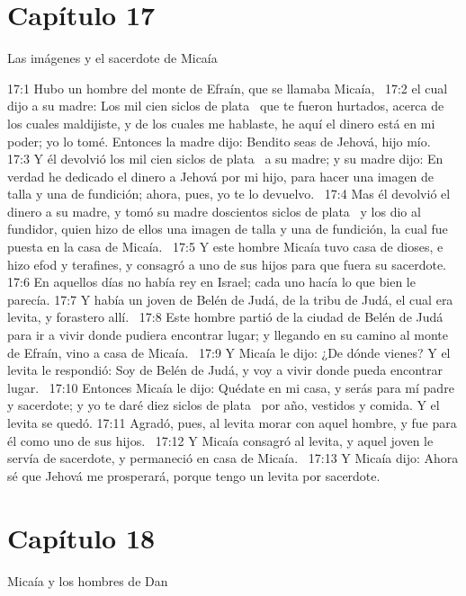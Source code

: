 \section*{Capítulo 17 }
Las imágenes y el sacerdote de Micaía 

17:1 Hubo un hombre del monte de Efraín, que se llamaba Micaía,  
17:2 el cual dijo a su madre: Los mil cien siclos de plata  que te fueron hurtados, acerca de los cuales maldijiste, y de los cuales me hablaste, he aquí el dinero está en mi poder; yo lo tomé. Entonces la madre dijo: Bendito seas de Jehová, hijo mío.  
17:3 Y él devolvió los mil cien siclos de plata  a su madre; y su madre dijo: En verdad he dedicado el dinero a Jehová por mi hijo, para hacer una imagen de talla y una de fundición; ahora, pues, yo te lo devuelvo.  
17:4 Mas él devolvió el dinero a su madre, y tomó su madre doscientos siclos de plata  y los dio al fundidor, quien hizo de ellos una imagen de talla y una de fundición, la cual fue puesta en la casa de Micaía.  
17:5 Y este hombre Micaía tuvo casa de dioses, e hizo efod y terafines, y consagró a uno de sus hijos para que fuera su sacerdote.  
17:6 En aquellos días no había rey en Israel; cada uno hacía lo que bien le parecía. 
17:7 Y había un joven de Belén de Judá, de la tribu de Judá, el cual era levita, y forastero allí.  
17:8 Este hombre partió de la ciudad de Belén de Judá para ir a vivir donde pudiera encontrar lugar; y llegando en su camino al monte de Efraín, vino a casa de Micaía.  
17:9 Y Micaía le dijo: ¿De dónde vienes? Y el levita le respondió: Soy de Belén de Judá, y voy a vivir donde pueda encontrar lugar.  
17:10 Entonces Micaía le dijo: Quédate en mi casa, y serás para mí padre y sacerdote; y yo te daré diez siclos de plata  por año, vestidos y comida. Y el levita se quedó. 
17:11 Agradó, pues, al levita morar con aquel hombre, y fue para él como uno de sus hijos.  
17:12 Y Micaía consagró al levita, y aquel joven le servía de sacerdote, y permaneció en casa de Micaía.  
17:13 Y Micaía dijo: Ahora sé que Jehová me prosperará, porque tengo un levita por sacerdote.  
\section*{Capítulo 18}
Micaía y los hombres de Dan  

